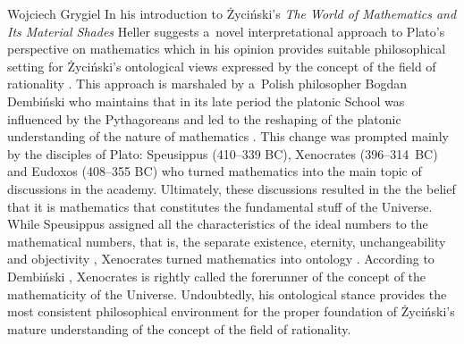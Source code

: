 \begin{artengenv}{Wojciech Grygiel}
In his introduction to Życiński's \textit{The World of Mathematics and Its Material Shades} Heller suggests a~novel interpretational approach to Plato's perspective on mathematics which in his opinion provides suitable philosophical setting for Życiński's ontological views expressed by the concept of the field of rationality
\parencite[][pp.5–15]{zycinski_swiat_2013}. %
 This approach is marshaled by a~Polish philosopher Bogdan Dembiński who maintains that in its late period the platonic School was influenced by the Pythagoreans and led to the reshaping of the platonic understanding of the nature of mathematics 
\parencites[][]{dembinski_pozna_2003}[][]{dembinski_pozny_2010}[][]{dembinski_o_2015}[][]{dembinski_u_2017}[][]{dembinski_theory_2019}. %
 This change was prompted mainly by the disciples of Plato: Speusippus (410--339 BC), Xenocrates (396--314~BC) and Eudoxos (408--355 BC) who turned mathematics into the main topic of discussions in the academy. Ultimately, these discussions resulted in the the belief that it is mathematics that constitutes the fundamental stuff of the Universe. While Speusippus assigned all the characteristics of the ideal numbers to the mathematical numbers, that is, the separate existence, eternity, unchangeability and objectivity 
\parencite[][pp.109–138]{dembinski_pozny_2010}, %
 Xenocrates turned mathematics into ontology 
\parencite[][pp.139–170]{dembinski_pozny_2010}. %
 According to Dembiński 
\parencite*[][p.158]{dembinski_pozny_2010}, %
 Xenocrates is rightly called the forerunner of the concept of the mathematicity of the Universe. Undoubtedly, his ontological stance provides the most consistent philosophical environment for the proper foundation of Życiński's mature understanding of the concept of the field of rationality.


\end{artengenv}
